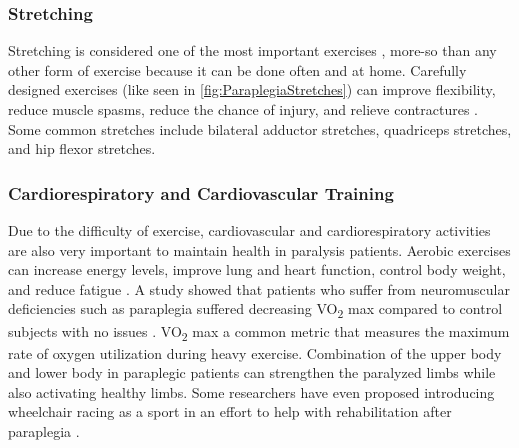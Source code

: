 \subsubsection{Stretching}
Stretching is considered one of the most important exercises \cite{RehabParaplegia}, more-so than any other form of exercise because it can be done often and at home. Carefully designed exercises (like seen in \autoref{fig:ParaplegiaStretches}) can improve flexibility, reduce muscle spasms, reduce the chance of injury, and relieve contractures \cite{ParalysisStretchingWeightLoadingPMID} \cite{ParalysisStretchingHarvey} \cite{ParalysisStretchingMichigan}. Some common stretches include bilateral adductor stretches, quadriceps stretches, and hip flexor stretches.

\subsubsection{Cardiorespiratory and Cardiovascular Training}
Due to the difficulty of exercise, cardiovascular and cardiorespiratory activities are also very important to maintain health in paralysis patients. Aerobic exercises can increase energy levels, improve lung and heart function, control body weight, and reduce fatigue \cite{RehabParaplegia} \cite{AerobicCapacityParaplegia}. A study showed that patients who suffer from neuromuscular deficiencies such as paraplegia suffered decreasing VO\textsubscript{2} max compared to control subjects with no issues \cite{AerobicCapacityParaplegia}. VO\textsubscript{2} max a common metric that measures the maximum rate of oxygen utilization during heavy exercise. Combination of the upper body and lower body in paraplegic patients can strengthen the paralyzed limbs while also activating healthy limbs. Some researchers have even proposed introducing wheelchair racing as a sport in an effort to help with rehabilitation after paraplegia \cite{WheelchairRacingParaplegia}.

